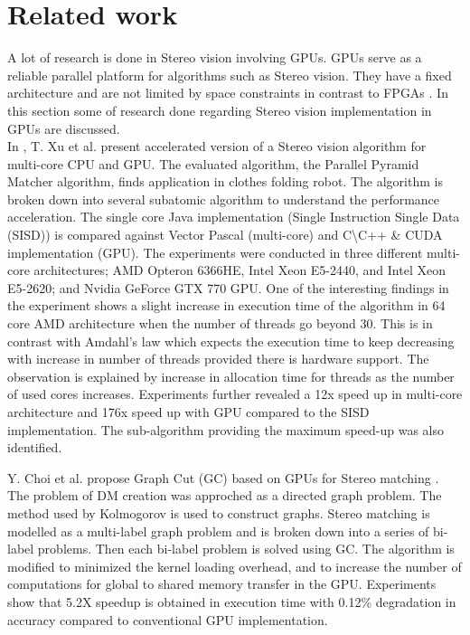 \section{Related work}
\label{s:rwork}
A lot of research is done in Stereo vision involving GPUs. GPUs serve as a reliable parallel platform for algorithms such as Stereo vision. They have a fixed architecture and are not limited by space constraints in contrast to FPGAs \cite{Kalarot2010}. In this section some of research done regarding Stereo vision implementation in GPUs are discussed.\\

In \cite{Xu2014}, T. Xu et al. present accelerated version of a Stereo vision algorithm for multi-core CPU and GPU. The evaluated algorithm, the Parallel Pyramid Matcher algorithm, finds application in clothes folding robot. The algorithm is broken down into several subatomic algorithm to understand the performance acceleration. The single core Java implementation (Single Instruction Single Data (SISD)) is compared against Vector Pascal (multi-core) and C\textbackslash C++ \& CUDA implementation (GPU). The experiments were conducted in three different multi-core architectures; AMD Opteron 6366HE, Intel Xeon E5-2440, and Intel Xeon E5-2620; and Nvidia GeForce GTX 770 GPU. One of the interesting findings in the experiment shows a slight increase in execution time of the algorithm in 64 core AMD architecture when the number of threads go beyond 30. This is in contrast with Amdahl's law which expects the execution time to keep decreasing with increase in number of threads provided there is hardware support. The observation is explained by increase in allocation time for threads as the number of used cores increases. Experiments further revealed a 12x speed up in multi-core architecture and 176x speed up with GPU compared to the SISD implementation. The sub-algorithm providing the maximum speed-up was also identified.

Y. Choi et al. propose Graph Cut (GC) based on GPUs for Stereo matching \cite{Choi2013}. The problem of DM creation was approched as a directed graph problem. The method used by Kolmogorov \cite{Kolmogorov2004} is used to construct graphs. Stereo matching is modelled as a multi-label graph problem and is broken down into a series of bi-label problems. Then each bi-label problem is solved using GC. The algorithm is modified to minimized the kernel loading overhead, and to increase the number of computations for global to shared memory transfer in the GPU. Experiments show that 5.2X speedup is obtained in execution time with 0.12\% degradation in accuracy compared to conventional GPU implementation.

